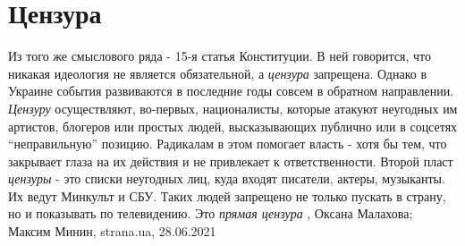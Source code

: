  
 
 
 
 
\chapter{Цензура}

Из того же смыслового ряда - 15-я статья Конституции. В ней говорится, что
никакая идеология не является обязательной, а \emph{цензура} запрещена.
Однако в Украине события развиваются в последние годы совсем в обратном
направлении.
\emph{Цензуру} осуществляют, во-первых, националисты, которые атакуют неугодных им
артистов, блогеров или простых людей, высказывающих публично или в соцсетях
\enquote{неправильную} позицию. Радикалам в этом помогает власть - хотя бы тем, что
закрывает глаза на их действия и не привлекает к ответственности.
Второй пласт \emph{цензуры} - это списки неугодных лиц, куда входят писатели, актеры,
музыканты. Их ведут Минкульт и СБУ. Таких людей запрещено не только пускать в
страну, но и показывать по телевидению. Это \emph{прямая цензура}
, 
Оксана Малахова; Максим Минин, strana.ua, 28.06.2021

